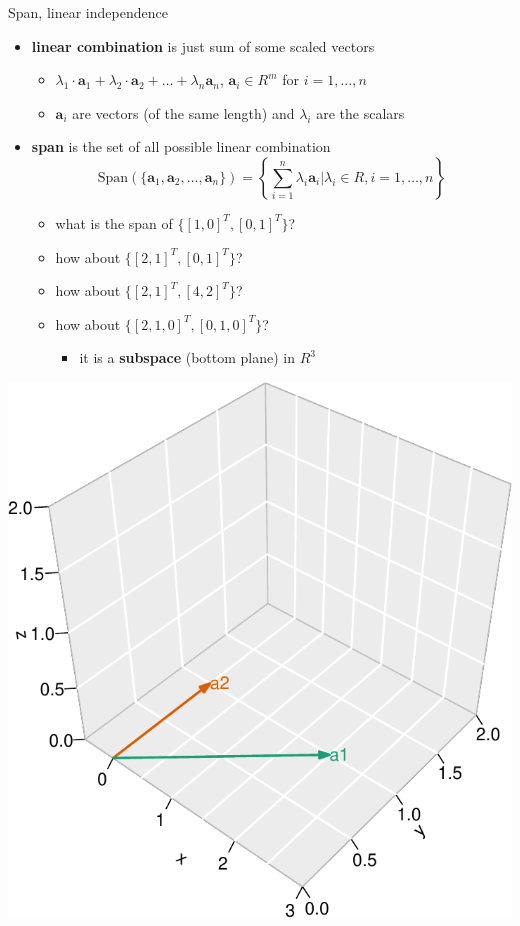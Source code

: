 \documentclass[ignorenonframetext,]{beamer}
\providecommand{\tightlist}{%
  \setlength{\itemsep}{0pt}\setlength{\parskip}{0pt}}
\newcommand{\vv}[1]{\boldsymbol{#1}}
\begin{document}
\begin{frame}{Span, linear independence}
\protect\hypertarget{span-linear-independence}{}

\begin{itemize}
\tightlist
\item
  \textbf{linear combination} is just sum of some scaled vectors

  \begin{itemize}
  \tightlist
  \item
    \(\lambda_1\cdot \vv{a}_1 + \lambda_2 \cdot \vv{a}_2+\ldots + \lambda_n\vv{a}_n\),
    \(\vv{a}_i \in R^m\) for \(i=1,\ldots,n\)
  \item
    \(\vv{a}_{i}\) are vectors (of the same length) and \(\lambda_i\)
    are the scalars
  \end{itemize}
\item
  \textbf{span} is the set of all possible linear combination
  \[\text{Span}( \{\vv{a}_{1}, \vv{a}_2, \ldots,\vv{a}_n\}) = \left\{\sum_{i=1}^n \lambda_i \vv{a}_i | \lambda_i \in R, i= 1,\ldots,n\right \}\]

  \begin{itemize}
  \tightlist
  \item
    what is the span of \(\{[1,0]^T, [0,1]^T\}\)?
  \item
    how about \(\{[2,1]^T, [0,1]^T\}\)?
  \item
    how about \(\{[2,1]^T, [4,2]^T\}\)?
  \item
    how about \(\{[2,1,0]^T, [0,1,0]^T\}\)?

    \begin{itemize}
    \tightlist
    \item
      it is a \textbf{subspace} (bottom plane) in \(R^3\)
    \end{itemize}
  \end{itemize}
\end{itemize}

\end{frame}

\begin{frame}{}
\protect\hypertarget{section-1}{}

\begin{center}\includegraphics[width=0.6\linewidth]{math4ml_files/figure-beamer/unnamed-chunk-7-1} \end{center}

\end{frame}
\end{document}
